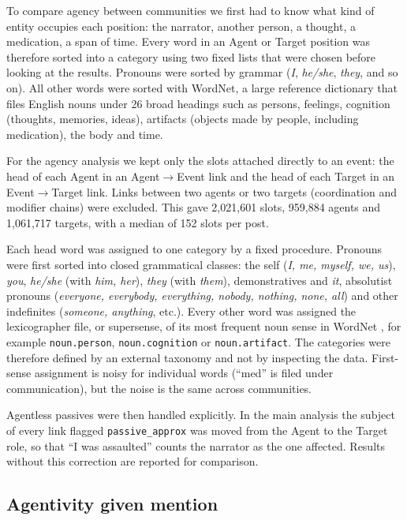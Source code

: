 \documentclass[11pt,a4paper]{article}
\begin{document}
To compare agency between communities we first had to know what kind of entity occupies each position: the narrator, another person, a thought, a medication, a span of time. Every word in an Agent or Target position was therefore sorted into a category using two fixed lists that were chosen before looking at the results. Pronouns were sorted by grammar (\textit{I}, \textit{he/she}, \textit{they}, and so on). All other words were sorted with WordNet, a large reference dictionary that files English nouns under 26 broad headings such as persons, feelings, cognition (thoughts, memories, ideas), artifacts (objects made by people, including medication), the body and time.

For the agency analysis we kept only the slots attached directly to an event: the head of each Agent in an Agent$\to$Event link and the head of each Target in an Event$\to$Target link. Links between two agents or two targets (coordination and modifier chains) were excluded. This gave 2,021,601 slots, 959,884 agents and 1,061,717 targets, with a median of 152 slots per post.

Each head word was assigned to one category by a fixed procedure. Pronouns were first sorted into closed grammatical classes: the self (\textit{I, me, myself, we, us}), \textit{you}, \textit{he/she} (with \textit{him, her}), \textit{they} (with \textit{them}), demonstratives and \textit{it}, absolutist pronouns (\textit{everyone, everybody, everything, nobody, nothing, none, all}) and other indefinites (\textit{someone, anything}, etc.). Every other word was assigned the lexicographer file, or supersense, of its most frequent noun sense in WordNet \citep{miller1995,ciaramita2003}, for example \texttt{noun.person}, \texttt{noun.cognition} or \texttt{noun.artifact}. The categories were therefore defined by an external taxonomy and not by inspecting the data. First-sense assignment is noisy for individual words (``med'' is filed under communication), but the noise is the same across communities.

Agentless passives were then handled explicitly. In the main analysis the subject of every link flagged \texttt{passive\_approx} was moved from the Agent to the Target role, so that ``I was assaulted'' counts the narrator as the one affected. Results without this correction are reported for comparison.

\subsection{Agentivity given mention}\label{sec:agentivity}
\end{document}
